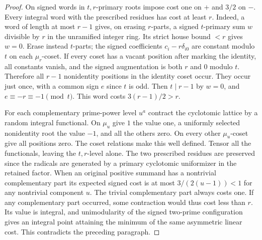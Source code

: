 \documentclass[11pt,a4paper]{article}
\numberwithin{equation}{section}
\theoremstyle{remark}
\begin{document}
\begin{proof}
On signed words in $t,r$-primary roots impose cost one on $+$ and
$3/2$ on $-$. Every integral word with the prescribed residues has
cost at least $r$. Indeed, a word of length at most $r-1$ gives, on
erasing $r$-parts, a signed $t$-primary sum $w$ divisible by $r$ in
the unramified integer ring. Its strict house bound $<r$ gives
$w=0$. Erase instead $t$-parts; the signed coefficients
$c_i-r\delta_{i0}$ are constant modulo $t$ on each $\mu_r$-coset.
If every coset has a vacant position after marking the identity,
all constants vanish, and the signed augmentation is both $r$ and
$0$ modulo $t$. Therefore all $r-1$ nonidentity positions in the
identity coset occur. They occur just once, with a common sign
$e$ since $t$ is odd. Then $t\mid r-1$ by $w=0$, and
$e\equiv-r\equiv-1\pmod t$. This word costs $3(r-1)/2>r$.

For each complementary prime-power level $u^a$ contract the cyclotomic
lattice by a random integral functional. On $\mu_u$ give $1$ the
value one, a uniformly selected nonidentity root the value $-1$,
and all the others zero. On every other $\mu_u$-coset give all
positions zero. The coset relations make this well defined. Tensor
all the functionals, leaving the $t,r$-level alone. The two prescribed
residues are preserved since the radicals are generated by a primary
cyclotomic uniformizer in the retained factor. When an original
positive summand has a nontrivial complementary part its expected
signed cost is at most $3/(2(u-1))<1$ for any nontrivial component
$u$. The trivial complementary part always costs one. If any
complementary part occurred, some contraction would thus cost less
than $r$. Its value is integral, and unimodularity of the signed
two-prime configuration \cite[Theorems~3 and~13]{BH} gives an integral point attaining the
minimum of the same asymmetric linear cost. This contradicts the
preceding paragraph.


\end{proof}
\end{document}
